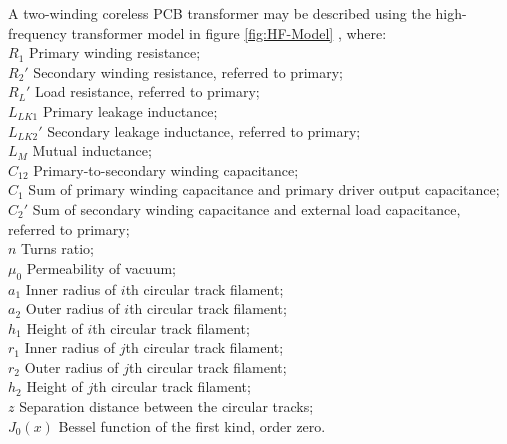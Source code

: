 \documentclass[conference]{IEEEtran}
\begin{document}
A two-winding coreless PCB transformer may be described using the high-frequency transformer model in figure \ref{fig:HF-Model} \cite{TangHuiFundamental}, where:
\\$ R_{1}    $ \hspace{20pt} Primary winding resistance;
\\$ R_{2}'   $ \hspace{20pt} Secondary winding resistance, referred to primary;
\\$ R_{L}'   $ \hspace{20pt} Load resistance, referred to primary;
\\$ L_{LK1}  $ \hspace{12pt} Primary leakage inductance;
\\$ L_{LK2}' $ \hspace{12pt} Secondary leakage inductance, referred to primary;
\\$ L_{M}    $ \hspace{20pt} Mutual inductance;
\\$ C_{12}   $ \hspace{19pt} Primary-to-secondary winding capacitance;
\\$ C_{1}    $ \hspace{20pt} Sum of primary winding capacitance and primary driver output capacitance;
\\$ C_{2}'   $ \hspace{20pt} Sum of secondary winding capacitance and external load capacitance, referred to primary;
\\$ n        $ \hspace{25pt} Turns ratio;
\\$ \mu_{0}  $ \hspace{20pt} Permeability of vacuum;
\\$ a_{1}    $ \hspace{20pt} Inner radius of $i$th circular track filament;
\\$ a_{2}    $ \hspace{20pt} Outer radius of $i$th circular track filament;
\\$ h_{1}    $ \hspace{20pt} Height of $i$th circular track filament;
\\$ r_{1}    $ \hspace{20pt} Inner radius of $j$th circular track filament;
\\$ r_{2}    $ \hspace{20pt} Outer radius of $j$th circular track filament;
\\$ h_{2}    $ \hspace{20pt} Height of $j$th circular track filament;
\\$ z        $ \hspace{26pt} Separation distance between the circular tracks;
\\$ J_{0}(x) $ \hspace{9pt}  Bessel function of the first kind, order zero.
\end{document}
